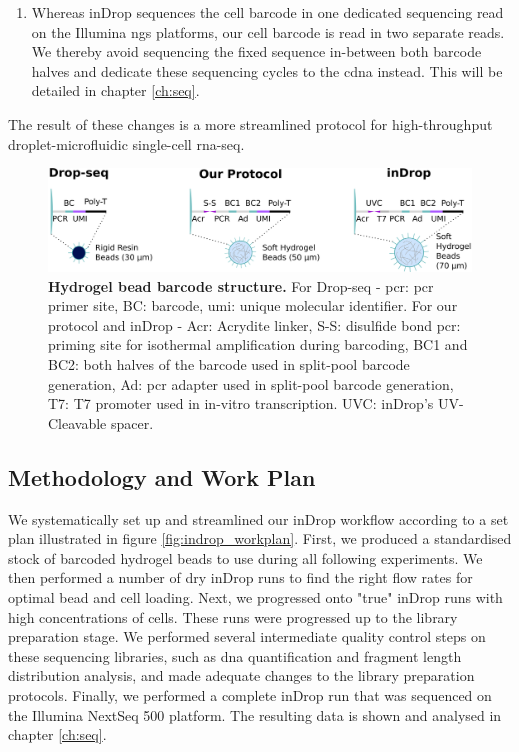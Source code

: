\begin{enumerate}
	\item Whereas inDrop sequences the cell barcode in one dedicated sequencing read on the Illumina \acrshort{ngs} platforms, our cell barcode is read in two separate reads. We thereby avoid sequencing the fixed sequence in-between both barcode halves and dedicate these sequencing cycles to the \acrshort{cdna} instead. This will be detailed in chapter \ref{ch:seq}.
\end{enumerate}

The result of these changes is a more streamlined protocol for high-throughput droplet-microfluidic single-cell \acrshort{rna-seq}.\pms

\clearpage

\begin{figure}[ht]
\centerfloat
\includegraphics[width=\textwidth]{./ims/indrop_beads.png}
\caption[Differences in bead and barcode structure]{\textbf{Hydrogel bead barcode structure.} For Drop-seq - \acrshort{pcr}: \acrshort{pcr} primer site, BC: barcode, \acrshort{umi}: unique molecular identifier. For our protocol and inDrop - Acr: Acrydite linker, S-S: disulfide bond \acrshort{pcr}: priming site for isothermal amplification during barcoding, BC1 and BC2: both halves of the barcode used in split-pool barcode generation, Ad: \acrshort{pcr} adapter used in split-pool barcode generation, T7: T7 promoter used in in-vitro transcription. UVC: inDrop's UV-Cleavable spacer.}
 \label{fig:}
\end{figure}

\subsection{Methodology and Work Plan}
We systematically set up and streamlined our inDrop workflow according to a set plan illustrated in figure \ref{fig:indrop_workplan}. First, we produced a standardised stock of barcoded hydrogel beads to use during all following experiments. We then performed a number of dry inDrop runs to find the right flow rates for optimal bead and cell loading. Next, we progressed onto "true" inDrop runs with high concentrations of cells. These runs were progressed up to the library preparation stage. We performed several intermediate quality control steps on these sequencing libraries, such as \acrshort{dna} quantification and fragment length distribution analysis, and made adequate changes to the library preparation protocols. Finally, we performed a complete inDrop run that was sequenced on the Illumina NextSeq 500 platform. The resulting data is shown and analysed in chapter \ref{ch:seq}.

